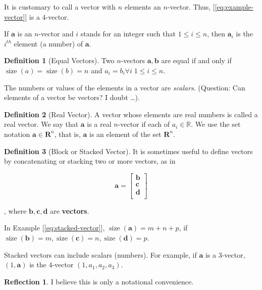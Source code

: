 \documentclass[11pt]{book}
\theoremstyle{definition}
\newtheorem{definition}{Definition}
\theoremstyle{plain}
\theoremstyle{problemstyle}
\theoremstyle{remark}
\theoremstyle{definition}
\newtheorem{reflection}{Reflection}
\DeclareMathOperator{\size}{size}
\newcommand{\sizea}{\size(\boldsymbol{a})}
\newcommand{\sizeb}{\size(\boldsymbol{b})}
\newcommand{\sizec}{\size(\boldsymbol{c})}
\newcommand{\sized}{\size(\boldsymbol{d})}
\begin{document}
It is customary to call a vector with $n$ elements an $n$-vector. Thus, [\ref{eq:example-vector}] is a $4$-vector.

If $\boldsymbol{a}$ is an $n$-vector and $i$ stands for an integer such that $1\le i\le n$, then $\boldsymbol{a}_i$ is the $i^{th}$ element (a number) of $\boldsymbol{a}$.


\begin{definition}[Equal Vectors]
    \label{def:equal-vectors}
    Two $n$-vectors $\boldsymbol{a},\boldsymbol{b}$ are equal if and only if $\size(a)=\size(b)=n$ and $a_i=b_i\forall i\;1\leq i\leq n$.

\end{definition}

The numbers or values of the elements in a vector are \emph{scalars}. (Question: Can elements of a vector be vectors? I doubt \dots).

\begin{definition}[Real Vector]
    \label{def:real-vector}
    A vector whose elements are real numbers is called a real vector. We say that $\boldsymbol{a}$ is a real $n$-vector if each of $a_i\in\mathbb{R}$. We use the set notation $\boldsymbol{a}\in\mathbf{R}^n$, that is, $\boldsymbol{a}$ is an element of the set $\mathbf{R}^n$.
\end{definition}


\begin{definition}[Block or Stacked Vector]
    \label{def:stacked-vector}
    It is sometimes useful to define vectors by concatenating or stacking two or more vectors, as in

    \begin{equation}
        \label{eq:stacked-vector}
        \boldsymbol{a}=
    \begin{bmatrix}
        \boldsymbol{b}\\
        \boldsymbol{c}\\
        \boldsymbol{d}\\
    \end{bmatrix}
    \end{equation}
    
        , where $\boldsymbol{b}, \boldsymbol{c}, \boldsymbol{d}$ are \textbf{vectors}.

        In Example [\ref{eq:stacked-vector}], $\sizea=m+n+p$, if $\sizeb=m,\sizec=n,\sized=p$.

        Stacked vectors can include scalars (numbers). For example, if $\boldsymbol{a}$ is a $3$-vector, $(1, \boldsymbol{a})$ is the $4$-vector $(1,a_1,a_2,a_3)$.
        \begin{reflection}
            I believe this is only a notational convenience.
        \end{reflection}
\end{definition}
\end{document}
